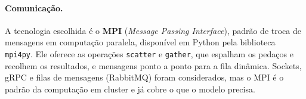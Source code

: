 \paragraph{Comunicação.} A tecnologia escolhida é o \textbf{MPI}
(\emph{Message Passing Interface}), padrão de troca de mensagens em
computação paralela, disponível em Python pela biblioteca
\texttt{mpi4py}. Ele oferece as operações \texttt{scatter} e
\texttt{gather}, que espalham os pedaços e recolhem os resultados, e
mensagens ponto a ponto para a fila dinâmica. Sockets, gRPC e filas de
mensagens (RabbitMQ) foram considerados, mas o MPI é o padrão da
computação em cluster e já cobre o que o modelo precisa.
